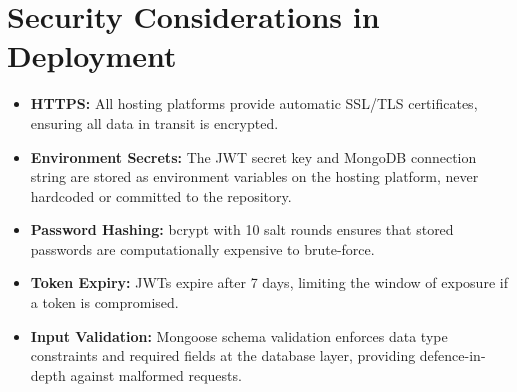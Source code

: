 \section{Security Considerations in Deployment}
\begin{itemize}
    \item \textbf{HTTPS:} All hosting platforms provide automatic SSL/TLS certificates, ensuring all data in transit is encrypted.
    \item \textbf{Environment Secrets:} The JWT secret key and MongoDB connection string are stored as environment variables on the hosting platform, never hardcoded or committed to the repository.
    \item \textbf{Password Hashing:} bcrypt with 10 salt rounds ensures that stored passwords are computationally expensive to brute-force.
    \item \textbf{Token Expiry:} JWTs expire after 7 days, limiting the window of exposure if a token is compromised.
    \item \textbf{Input Validation:} Mongoose schema validation enforces data type constraints and required fields at the database layer, providing defence-in-depth against malformed requests.
\end{itemize}